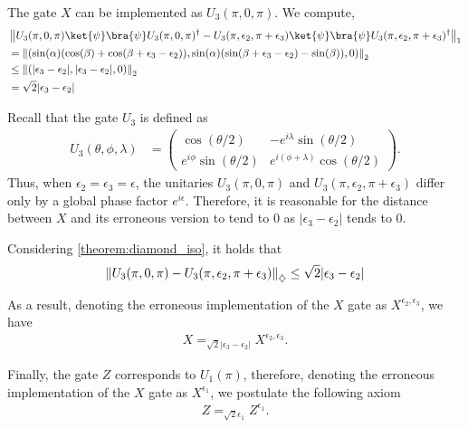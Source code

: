 \begin{example}
    The gate $X$ can be implemented as $U_3(\pi, 0, \pi)$. We compute,
    \begin{align*}
      &\tracenorm{U_3(\pi, 0 , \pi) \ket{\psi}\bra{\psi}U_3(\pi,0,\pi)^\dag - U_3(\pi,\epsilon_2,\pi+\epsilon_3)  \ket{\psi}\bra{\psi}U_3(\pi,\epsilon_2,\pi+\epsilon_3)^\dag}  \\
      & =\euclideannorm{( \sin(\alpha) (\cos(\beta)+\cos(\beta + \epsilon_3-\epsilon_2)), \sin(\alpha) (\sin(\beta + \epsilon_3-\epsilon_2)-\sin(\beta)),0 )} \\
      &  \leq \euclideannorm{(|\epsilon_3-\epsilon_2|, |\epsilon_3-\epsilon_2|,0 )} \\
      & = \sqrt{2} |\epsilon_3-\epsilon_2|
    \end{align*}

   Recall that the gate $U_3$ is defined as
\begin{align*}
    U_3(\theta, \phi, \lambda) &= 
    \begin{pmatrix}
        \cos(\theta/2) & -e^{i\lambda}\sin(\theta/2) \\
        e^{i\phi}\sin(\theta/2) & e^{i(\phi+\lambda)}\cos(\theta/2)
    \end{pmatrix}.
\end{align*}
Thus, when $\epsilon_2 = \epsilon_3 = \epsilon$, the unitaries $U_3(\pi, 0, \pi)$ and $U_3(\pi, \epsilon_2, \pi + \epsilon_3)$ differ only by a global phase factor $e^{i\epsilon}$. Therefore, it is reasonable for the distance between $X$ and its erroneous version to tend to $0$ as $|\epsilon_3 - \epsilon_2|$ tends to $0$.

    Considering \autoref{theorem:diamond_iso}, it holds that
    \begin{align*}
      \left\lVert U_3(\pi, 0 , \pi)- U_3(\pi,\epsilon_2,\pi+\epsilon_3)  \right\rVert_{\diamondsuit} \leq \sqrt{2} |\epsilon_3-\epsilon_2|
    \end{align*}

    As a result, denoting the erroneous implementation of the $X$ gate as $X^{\epsilon_2, \epsilon_3}$, we have
    \begin{align} \label{eq:x_error_telepor}
      X =_{\sqrt{2} |\epsilon_3-\epsilon_2|} X^{\epsilon_2, \epsilon_3}.
    \end{align}
  

    Finally, the gate $Z$ corresponds to $U_1(\pi)$, therefore, denoting the erroneous implementation of the $X$ gate as $X^{\epsilon_1}$, we postulate the following axiom
    \begin{align} \label{eq:z_error_telepor}
      Z =_{\sqrt{2} \epsilon_1} Z^{\epsilon_1}.
    \end{align}


\end{example}
